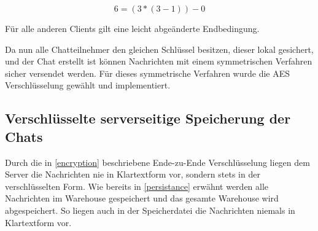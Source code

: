 $$ 6 = (3 * (3 - 1)) - 0 $$

Für alle anderen Clients gilt eine leicht abgeänderte Endbedingung.

Da nun alle Chatteilnehmer den gleichen Schlüssel besitzen, dieser 
lokal gesichert, und der Chat erstellt ist können Nachrichten mit 
einem symmetrischen Verfahren sicher versendet werden. Für dieses 
symmetrische Verfahren wurde die AES Verschlüsselung gewählt und
implementiert.

\author{Troy Keßler}
\subsection{Verschlüsselte serverseitige Speicherung der Chats}
Durch die in \ref{encryption} beschriebene Ende-zu-Ende Verschlüsselung liegen dem Server die Nachrichten nie in Klartextform vor, sondern stets in der verschlüsselten Form. Wie bereits in \ref{persistance} erwähnt werden alle Nachrichten im Warehouse gespeichert und das gesamte Warehouse wird abgespeichert. So liegen auch in der Speicherdatei die Nachrichten niemals in Klartextform vor.
